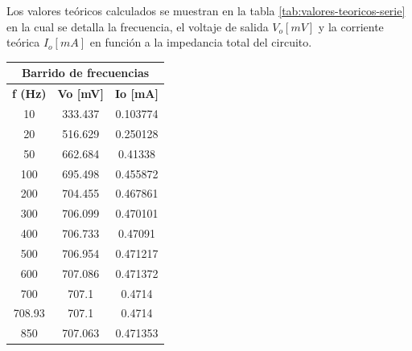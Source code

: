 \documentclass[conference]{IEEEtran}
\begin{document}
	Los valores teóricos calculados se muestran en la tabla \ref{tab:valores-teoricos-serie} en la cual se detalla la frecuencia, el voltaje de salida $V_o [mV]$ y la corriente teórica $I_o [mA]$ en función a la impedancia total del circuito.  
	
	\begin{table}[]
		\centering
		\begin{tabular}{|ccc|}
			\hline
			\multicolumn{3}{|c|}{\textbf{Barrido de frecuencias}}                                                    \\ \hline
			\multicolumn{1}{|c|}{\textbf{f (Hz)}} & \multicolumn{1}{c|}{\textbf{Vo {[}mV{]}}} & \textbf{Io {[}mA{]}} \\ \hline
			\multicolumn{1}{|c|}{10}              & \multicolumn{1}{c|}{333.437}              & 0.103774             \\ \hline
			\multicolumn{1}{|c|}{20}              & \multicolumn{1}{c|}{516.629}              & 0.250128             \\ \hline
			\multicolumn{1}{|c|}{50}              & \multicolumn{1}{c|}{662.684}              & 0.41338              \\ \hline
			\multicolumn{1}{|c|}{100}             & \multicolumn{1}{c|}{695.498}              & 0.455872             \\ \hline
			\multicolumn{1}{|c|}{200}             & \multicolumn{1}{c|}{704.455}              & 0.467861             \\ \hline
			\multicolumn{1}{|c|}{300}             & \multicolumn{1}{c|}{706.099}              & 0.470101             \\ \hline
			\multicolumn{1}{|c|}{400}             & \multicolumn{1}{c|}{706.733}              & 0.47091              \\ \hline
			\multicolumn{1}{|c|}{500}             & \multicolumn{1}{c|}{706.954}              & 0.471217             \\ \hline
			\multicolumn{1}{|c|}{600}             & \multicolumn{1}{c|}{707.086}              & 0.471372             \\ \hline
			\multicolumn{1}{|c|}{700}             & \multicolumn{1}{c|}{707.1}                & 0.4714               \\ \hline
			\multicolumn{1}{|c|}{708.93}          & \multicolumn{1}{c|}{707.1}                & 0.4714               \\ \hline
			\multicolumn{1}{|c|}{850}             & \multicolumn{1}{c|}{707.063}              & 0.471353             \\ \hline

\end{tabular}
\end{table}
\end{document}

